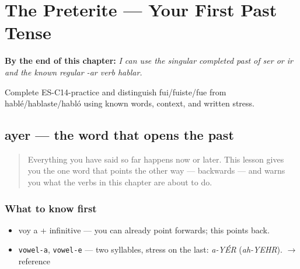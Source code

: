 
\chapter{The Preterite --- Your First Past Tense}
\label{ch:preterite}

\begin{chapteropening}
\textbf{By the end of this chapter:} \emph{I can use the singular completed past of ser or ir and the known regular -ar verb hablar.}

Complete ES-C14-practice and distinguish fui/fuiste/fue from hablé/hablaste/habló using known words, context, and written stress.
\end{chapteropening}

\section[ayer]{ayer — the word that opens the past}

\label{lesson:ES-C14-ayer}



\begin{quote}
Everything you have said so far happens now or later. This lesson gives you the one word that points the other way — backwards — and warns you what the verbs in this chapter are about to do.
\end{quote}

\subsection*{What to know first}
\begin{itemize}
\raggedright
  \item voy a + infinitive — you can already point forwards; this points back.
\end{itemize}

\begin{sounds}
\begin{itemize}
\raggedright
  \item \texttt{vowel-a}, \texttt{vowel-e} — two syllables, stress on the last: \emph{a-YÉR} (\emph{ah-YEHR}). $\to$ reference
\end{itemize}
\end{sounds}

